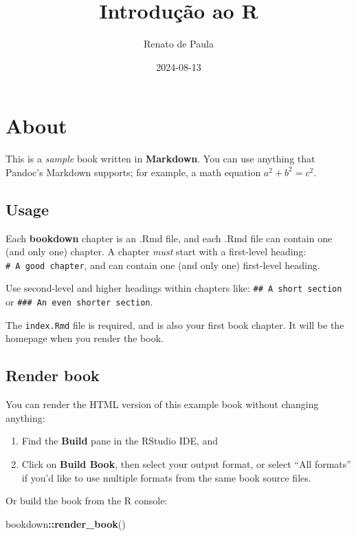 \documentclass[
]{book}
\title{Introdução ao R}
\author{Renato de Paula}
\date{2024-08-13}
\newenvironment{Shaded}{\begin{snugshade}}{\end{snugshade}}
\newcommand{\FunctionTok}[1]{\textcolor[rgb]{0.13,0.29,0.53}{\textbf{#1}}}
\newcommand{\NormalTok}[1]{#1}
\newcommand{\SpecialCharTok}[1]{\textcolor[rgb]{0.81,0.36,0.00}{\textbf{#1}}}
\theoremstyle{definition}
\theoremstyle{definition}
\theoremstyle{definition}
\theoremstyle{definition}
\theoremstyle{remark}
\begin{document}
\maketitle

{
\setcounter{tocdepth}{1}
\tableofcontents
}
\chapter{About}\label{about}

This is a \emph{sample} book written in \textbf{Markdown}. You can use anything that Pandoc's Markdown supports; for example, a math equation \(a^2 + b^2 = c^2\).

\section{Usage}\label{usage}

Each \textbf{bookdown} chapter is an .Rmd file, and each .Rmd file can contain one (and only one) chapter. A chapter \emph{must} start with a first-level heading: \texttt{\#\ A\ good\ chapter}, and can contain one (and only one) first-level heading.

Use second-level and higher headings within chapters like: \texttt{\#\#\ A\ short\ section} or \texttt{\#\#\#\ An\ even\ shorter\ section}.

The \texttt{index.Rmd} file is required, and is also your first book chapter. It will be the homepage when you render the book.

\section{Render book}\label{render-book}

You can render the HTML version of this example book without changing anything:

\begin{enumerate}
\def\labelenumi{\arabic{enumi}.}
\item
  Find the \textbf{Build} pane in the RStudio IDE, and
\item
  Click on \textbf{Build Book}, then select your output format, or select ``All formats'' if you'd like to use multiple formats from the same book source files.
\end{enumerate}

Or build the book from the R console:

\begin{Shaded}
\begin{Highlighting}[]
\NormalTok{bookdown}\SpecialCharTok{::}\FunctionTok{render\_book}\NormalTok{()}
\end{Highlighting}
\end{Shaded}
\end{document}
